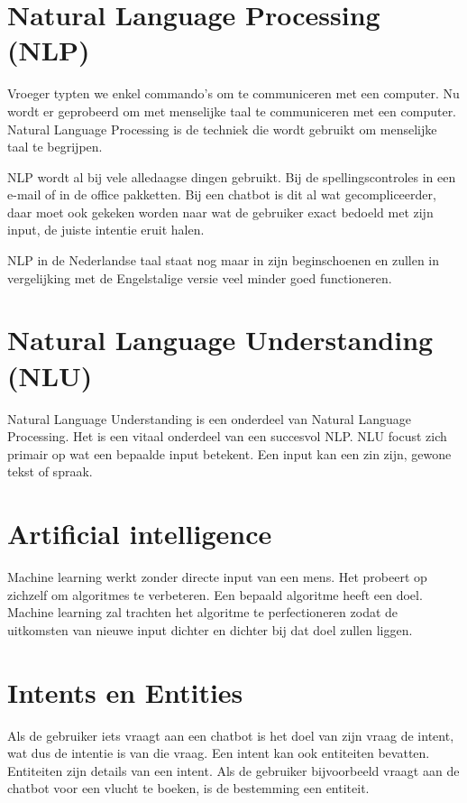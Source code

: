 \section{Natural Language Processing (NLP)}
\label{sec:Natural Language Processing}

Vroeger typten we enkel commando's om te communiceren met een computer. Nu wordt er geprobeerd om met menselijke taal te communiceren met een computer. Natural Language Processing is de techniek die wordt gebruikt om menselijke taal te begrijpen.

NLP wordt al bij vele alledaagse dingen gebruikt. Bij de spellingscontroles in een e-mail of in de office pakketten. Bij een chatbot is dit al wat gecompliceerder, daar moet ook gekeken worden naar wat de gebruiker exact bedoeld met zijn input, de juiste intentie eruit halen.

NLP in de Nederlandse taal staat nog maar in zijn beginschoenen en zullen in vergelijking met de Engelstalige versie veel minder goed functioneren. ~\autocite{Dave2018}

\section{Natural Language Understanding (NLU)}
\label{sec:Natural Language Understanding}

Natural Language Understanding is een onderdeel van Natural Language Processing. Het is een vitaal onderdeel van een succesvol NLP. NLU focust zich primair op wat een bepaalde input betekent. Een input kan een zin zijn, gewone tekst of spraak. ~\autocite{Margaret2018}

\section{Artificial intelligence}
\label{sec:Artificial intelligence}

Machine learning werkt zonder directe input van een mens. Het probeert op zichzelf om algoritmes te verbeteren. Een bepaald algoritme heeft een doel. Machine learning zal trachten het algoritme te perfectioneren zodat de uitkomsten van nieuwe input dichter en dichter bij dat doel zullen liggen.

\section{Intents en Entities}
\label{sec:IntentsEntiteiten}

Als de gebruiker iets vraagt aan een chatbot is het doel van zijn vraag de intent, wat dus de intentie is van die vraag. Een intent kan ook entiteiten bevatten. Entiteiten zijn details van een intent. Als de gebruiker bijvoorbeeld vraagt aan de chatbot voor een vlucht te boeken, is de bestemming een entiteit.

